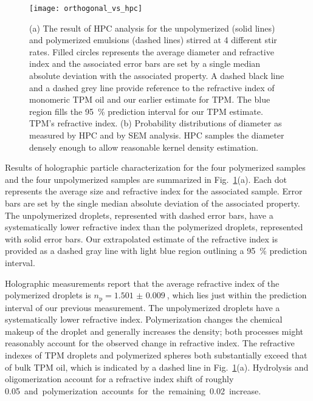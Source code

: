 \begin{figure}
    \centering
    \texttt{[image: orthogonal\_vs\_hpc]}
    \caption{(a) The result of HPC analysis for the unpolymerized (solid lines) and polymerized
      emulsions (dashed lines) stirred at \num{4} different stir rates. Filled circles
      represents the average diameter and refractive index and the associated error bars
      are set by a single median absolute deviation with the associated property.
      A dashed black line and a dashed grey line provide reference to the
      refractive index of monomeric TPM oil and our earlier estimate for TPM. The blue region
      fills the \SI{95}{\percent} prediction interval for our TPM estimate.
      TPM's refractive index. (b) Probability distributions of diameter as measured by
      HPC and by SEM analysis. HPC samples the diameter densely enough to allow
      reasonable kernel density estimation.}
    \label{fig:hpc_stir_rate}
\end{figure}


Results of holographic particle characterization for the four polymerized samples
and the four unpolymerized samples are summarized in Fig.~\ref{fig:hpc_stir_rate}(a).
Each dot represents the average size and refractive index for the associated sample.
Error bars are set by the single median absolute deviation of the associated property.
The unpolymerized droplets, represented with dashed error bars, have a systematically
lower refractive index than the polymerized droplets, represented with solid error bars.
Our extrapolated estimate of the refractive index is provided as a dashed gray
line with light blue region outlining a \SI{95}{\percent} prediction interval.

Holographic measurements report that the average refractive index of the
polymerized droplets
is $n_{\text{p}}=\SI{1.501(9)}{}$, which lies just within the prediction interval of our
previous measurement. The unpolymerized droplets have a systematically lower
refractive index.
Polymerization changes the chemical makeup of the droplet and generally increases the
density; %
both processes might reasonably account for the observed change in refractive index.
The refractive indexes of TPM droplets and polymerized spheres both
substantially exceed that of bulk TPM oil, which is indicated by
a dashed line in Fig.~\ref{fig:hpc_stir_rate}(a).
Hydrolysis and oligomerization account for a refractive
index shift of roughly \SI{0.05} and polymerization accounts for the remaining
\SI{0.02} increase.

